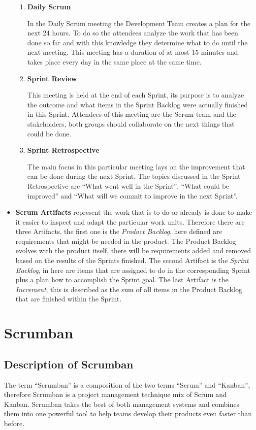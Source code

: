 \begin{itemize}
\begin{enumerate}
        \item \textbf{Daily Scrum}

        In the Daily Scrum meeting the Development Team creates a plan for the next 24 hours. To do so the attendees analyze the work that has been done so far and with this knowledge they determine what to do until the next meeting. This meeting has a duration of at most 15 minutes and takes place every day in the same place at the same time.

        \item \textbf{Sprint Review}

        This meeting is held at the end of each Sprint, its purpose is to analyze the outcome and what items in the Sprint Backlog were actually finished in this Sprint. Attendees of this meeting are the Scrum team and the stakeholders, both groups should collaborate on the next things that could be done.

        \item \textbf{Sprint Retrospective}

        The main focus in this particular meeting lays on the improvement that can be done during the next Sprint. The topics discussed in the Sprint Retrospective are ``What went well in the Sprint'', ``What could be improved'' and ``What will we commit to improve in the next Sprint''.
    \end{enumerate}

    \item \textbf{Scrum Artifacts} represent the work that is to do or already is done to make it easier to inspect and adapt the particular work units. Therefore there are three Artifacts, the first one is the \emph{Product Backlog}, here defined are requirements that might be needed in the product. The Product Backlog evolves with the product itself, there will be requirements added and removed based on the results of the Sprints finished. The second Artifact is the \emph{Sprint Backlog}, in here are items that are assigned to do in the corresponding Sprint plus a plan how to accomplish the Sprint goal. The last Artifact is the \emph{Increment}, this is described as the sum of all items in the Product Backlog that are finished within the Sprint.
\end{itemize}

\section{Scrumban}

\subsection{Description of Scrumban}
The term ``Scrumban'' is a composition of the two terms ``Scrum'' and ``Kanban'', therefore Scrumban is a project management technique mix of Scrum and Kanban. Scrumban takes the best of both management systems and combines them into one powerful tool to help teams develop their products even faster than before.

